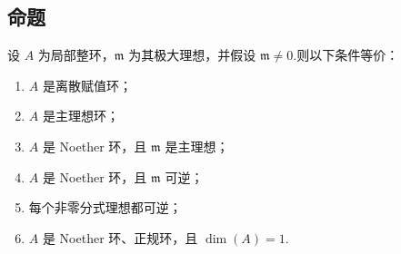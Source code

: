 \subsection{命题}\label{sec:nt-3-2-5}
\begin{proposition*}
设 $A$ 为局部整环，$\mathfrak m$ 为其极大理想，并假设 $\mathfrak m\ne0$.则以下条件等价：
\begin{enumerate}[label=\roman*)]
\item $A$ 是离散赋值环；
\item $A$ 是主理想环；
\item $A$ 是 Noether 环，且 $\mathfrak m$ 是主理想；
\item $A$ 是 Noether 环，且 $\mathfrak m$ 可逆；
\item 每个非零分式理想都可逆；
\item $A$ 是 Noether 环、正规环，且 $\dim(A)=1$.
\end{enumerate}
\end{proposition*}
